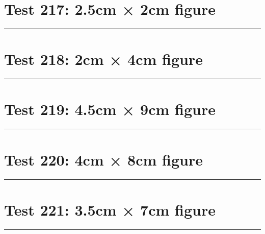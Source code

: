 \documentclass[a4paper,11pt]{article}
\begin{document}
\section*{Test 217: 2.5cm × 2cm figure}
\begin{swarmwrap}%
  \begin{minipage}[t]{2cm}
    \centering
    \rule{\linewidth}{2cm}
  \end{minipage}%
\end{swarmwrap}%
\swarmwrapnext
\lipsum[149]
\lipsum[150]
\lipsum[1]
\lipsum[2]
\lipsum[3]
\section*{Test 218: 2cm × 4cm figure}
\begin{swarmwrap}%
  \begin{minipage}[t]{2cm}
    \centering
    \rule{\linewidth}{4cm}
  \end{minipage}%
\end{swarmwrap}%
\swarmwrapnext
\lipsum[134]
\lipsum[135]
\lipsum[136]
\lipsum[137]
\lipsum[138]
\lipsum[139]
\section*{Test 219: 4.5cm × 9cm figure}
\begin{swarmwrap}%
  \begin{minipage}[t]{4cm}
    \centering
    \rule{\linewidth}{9cm}
  \end{minipage}%
\end{swarmwrap}%
\swarmwrapnext
\lipsum[48]
\lipsum[49]
\lipsum[50]
\lipsum[51]
\lipsum[52]
\section*{Test 220: 4cm × 8cm figure}
\begin{swarmwrap}%
  \begin{minipage}[t]{4cm}
    \centering
    \rule{\linewidth}{8cm}
  \end{minipage}%
\end{swarmwrap}%
\swarmwrapnext
\lipsum[25]
\lipsum[26]
\lipsum[27]
\lipsum[28]
\lipsum[29]
\lipsum[30]
\section*{Test 221: 3.5cm × 7cm figure}
\begin{swarmwrap}%
  \begin{minipage}[t]{3cm}
    \centering
    \rule{\linewidth}{7cm}
  \end{minipage}%
\end{swarmwrap}%
\swarmwrapnext
\lipsum[87]
\lipsum[88]
\lipsum[89]
\lipsum[90]
\lipsum[91]
\lipsum[92]
\end{document}

